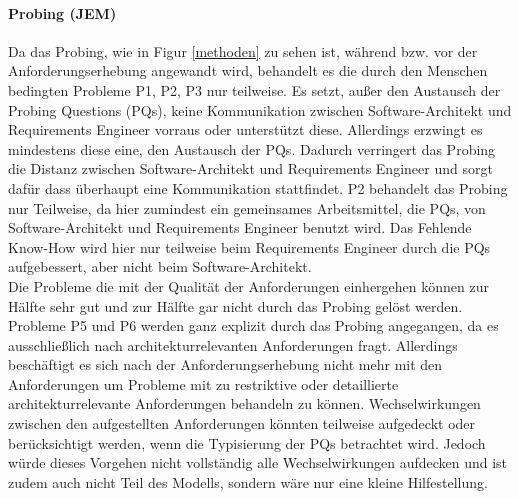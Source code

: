 \paragraph{Probing (JEM)}
Da das Probing, wie in Figur \ref{methoden} zu sehen ist, w\"ahrend bzw. vor der Anforderungserhebung angewandt wird, behandelt es die durch den Menschen bedingten Probleme P1, P2, P3 nur teilweise. Es setzt, au\ss{}er den Austausch der Probing Questions (PQs), keine Kommunikation zwischen Software-Architekt und Requirements Engineer vorraus oder unterst\"utzt diese. Allerdings erzwingt es mindestens diese eine, den Austausch der PQs. Dadurch verringert das Probing die Distanz zwischen Software-Architekt und Requirements Engineer und  sorgt daf\"ur dass \"uberhaupt eine Kommunikation stattfindet. P2 behandelt das Probing nur Teilweise, da hier zumindest ein gemeinsames Arbeitsmittel, die PQs, von Software-Architekt und Requirements Engineer benutzt wird. Das Fehlende Know-How wird hier nur teilweise beim Requirements Engineer durch die PQs aufgebessert, aber nicht beim Software-Architekt. \\
Die Probleme die mit der Qualit\"at der Anforderungen einhergehen k\"onnen zur H\"alfte sehr gut und zur H\"alfte gar nicht durch das Probing gel\"ost werden. Probleme P5 und P6 werden ganz explizit durch das Probing angegangen, da es ausschlie\ss{}lich nach architekturrelevanten Anforderungen fragt. Allerdings besch\"aftigt es sich nach der Anforderungserhebung nicht mehr mit den Anforderungen um Probleme mit zu restriktive oder detaillierte architekturrelevante Anforderungen behandeln zu k\"onnen. Wechselwirkungen zwischen den aufgestellten Anforderungen k\"onnten teilweise aufgedeckt oder ber\"ucksichtigt werden, wenn die Typisierung der PQs betrachtet wird. Jedoch w\"urde dieses Vorgehen nicht vollst\"andig alle Wechselwirkungen aufdecken und ist zudem auch nicht Teil des Modells, sondern w\"are nur eine kleine Hilfestellung. \\

